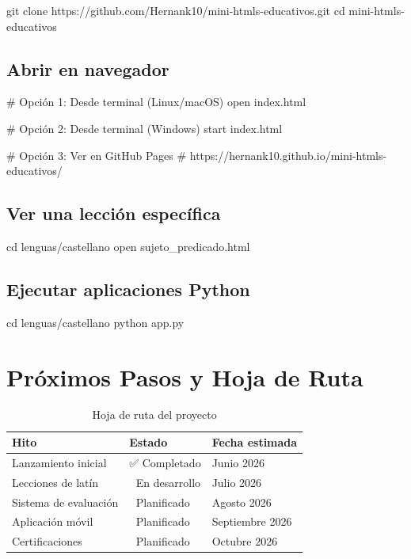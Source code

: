 \documentclass[12pt,spanish]{article}
\begin{document}
\begin{codigo}
git clone https://github.com/Hernank10/mini-htmls-educativos.git
cd mini-htmls-educativos
\end{codigo}

\subsection{Abrir en navegador}

\begin{codigo}
# Opción 1: Desde terminal (Linux/macOS)
open index.html

# Opción 2: Desde terminal (Windows)
start index.html

# Opción 3: Ver en GitHub Pages
# https://hernank10.github.io/mini-htmls-educativos/
\end{codigo}

\subsection{Ver una lección específica}

\begin{codigo}
cd lenguas/castellano
open sujeto_predicado.html
\end{codigo}

\subsection{Ejecutar aplicaciones Python}

\begin{codigo}
cd lenguas/castellano
python app.py
\end{codigo}

\section{Próximos Pasos y Hoja de Ruta}

\begin{table}[H]
\centering
\caption{Hoja de ruta del proyecto}
\label{tab:hojaruta}
\begin{tabular}{|p{5cm}|p{4cm}|p{4cm}|}
\hline
\textbf{Hito} & \textbf{Estado} & \textbf{Fecha estimada} \\
\hline
Lanzamiento inicial & ✅ Completado & Junio 2026 \\
\hline
Lecciones de latín & 🔄 En desarrollo & Julio 2026 \\
\hline
Sistema de evaluación & 📅 Planificado & Agosto 2026 \\
\hline
Aplicación móvil & 📅 Planificado & Septiembre 2026 \\
\hline
Certificaciones & 📅 Planificado & Octubre 2026 \\
\hline
\end{tabular}
\end{table}
\end{document}

